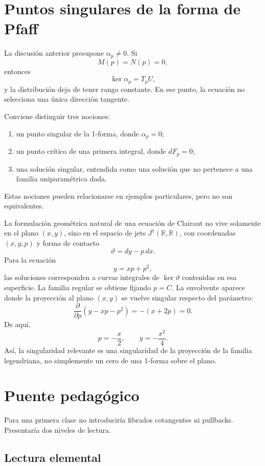 \documentclass[12pt,a4paper]{article}
\begin{document}
	\clearpage
	\section{Puntos singulares de la forma de Pfaff}

	La discusión anterior presupone \(\alpha_p\neq 0\). Si
	\[
	M(p)=N(p)=0,
	\]
entonces
	\[
	\ker\alpha_p=T_pU,
	\]
y la distribución deja de tener rango constante. En ese punto, la ecuación no selecciona una única dirección tangente.

	Conviene distinguir tres nociones:

	\begin{enumerate}[label=\arabic*.]
		\item un punto singular de la 1-forma, donde \(\alpha_p=0\);
		\item un punto crítico de una primera integral, donde \(dF_p=0\);
		\item una solución singular, entendida como una solución que no pertenece a una familia uniparamétrica dada.
	\end{enumerate}

	Estas nociones pueden relacionarse en ejemplos particulares, pero no son equivalentes.

	La formulación geométrica natural de una ecuación de Clairaut no vive solamente en el plano \((x,y)\), sino en el espacio de jets \(J^1(\mathbb{R},\mathbb{R})\), con coordenadas \((x,y,p)\) y forma de contacto
	\[
	\vartheta=dy-p\,dx.
	\]
Para la ecuación
	\[
	y=xp+p^2,
	\]
las soluciones corresponden a curvas integrales de \(\ker\vartheta\) contenidas en esa superficie. La familia regular se obtiene fijando \(p=C\). La envolvente aparece donde la proyección al plano \((x,y)\) se vuelve singular respecto del parámetro:
	\[
	\frac{\partial}{\partial p}\left(y-xp-p^2\right)=-(x+2p)=0.
	\]
De aquí,
	\[
	p=-\frac{x}{2},
	\qquad
	y=-\frac{x^2}{4}.
	\]
Así, la singularidad relevante es una singularidad de la proyección de la familia legendriana, no simplemente un cero de una 1-forma sobre el plano.

	\clearpage
	\section{Puente pedagógico}

	Para una primera clase no introduciría fibrados cotangentes ni pullbacks. Presentaría dos niveles de lectura.

	\subsection{Lectura elemental}
\end{document}

